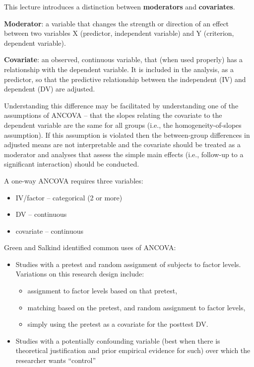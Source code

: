 \documentclass[
  11pt,
]{book}
\providecommand{\tightlist}{%
  \setlength{\itemsep}{0pt}\setlength{\parskip}{0pt}}
\begin{document}
This lecture introduces a distinction between \textbf{moderators} and \textbf{covariates}.

\textbf{Moderator}: a variable that changes the strength or direction of an effect between two variables X (predictor, independent variable) and Y (criterion, dependent variable).

\textbf{Covariate}: an observed, continuous variable, that (when used properly) has a relationship with the dependent variable. It is included in the analysis, as a predictor, so that the predictive relationship between the independent (IV) and dependent (DV) are adjusted.

Understanding this difference may be facilitated by understanding one of the assumptions of ANCOVA -- that the slopes relating the covariate to the dependent variable are the same for all groups (i.e., the homogeneity-of-slopes assumption). If this assumption is violated then the between-group differences in adjusted means are not interpretable and the covariate should be treated as a moderator and analyses that assess the simple main effects (i.e., follow-up to a significant interaction) should be conducted.

A one-way ANCOVA requires three variables:

\begin{itemize}
\tightlist
\item
  IV/factor -- categorical (2 or more)
\item
  DV -- continuous
\item
  covariate -- continuous
\end{itemize}

Green and Salkind \citep{green_one-way_2014} identified common uses of ANCOVA:

\begin{itemize}
\tightlist
\item
  Studies with a pretest and random assignment of subjects to factor levels. Variations on this research design include:

  \begin{itemize}
  \tightlist
  \item
    assignment to factor levels based on that pretest,
  \item
    matching based on the pretest, and random assignment to factor levels,
  \item
    simply using the pretest as a covariate for the posttest DV.
  \end{itemize}
\item
  Studies with a potentially confounding variable (best when there is theoretical justification and prior empirical evidence for such) over which the researcher wants ``control''
\end{itemize}
\end{document}
